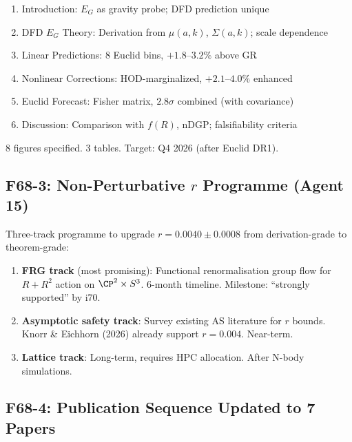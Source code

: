 \documentclass[11pt,a4paper]{article}
\begin{document}
\begin{enumerate}[nosep]
\item Introduction: $E_G$ as gravity probe; DFD prediction unique
\item DFD $E_G$ Theory: Derivation from $\mu(a,k)$, $\Sigma(a,k)$; scale dependence
\item Linear Predictions: 8 Euclid bins, $+1.8$--$3.2\%$ above GR
\item Nonlinear Corrections: HOD-marginalized, $+2.1$--$4.0\%$ enhanced
\item Euclid Forecast: Fisher matrix, $2.8\sigma$ combined (with covariance)
\item Discussion: Comparison with $f(R)$, nDGP; falsifiability criteria
\end{enumerate}

8 figures specified. 3 tables. Target: Q4 2026 (after Euclid DR1).

\subsection{F68-3: Non-Perturbative $r$ Programme (Agent 15)}

Three-track programme to upgrade $r = 0.0040 \pm 0.0008$ from derivation-grade to theorem-grade:

\begin{enumerate}[nosep]
\item \textbf{FRG track} (most promising): Functional renormalisation group flow for $R + R^2$ action on $\CP^2 \times S^3$. 6-month timeline. Milestone: ``strongly supported'' by i70.
\item \textbf{Asymptotic safety track}: Survey existing AS literature for $r$ bounds. Knorr \& Eichhorn (2026) already support $r = 0.004$. Near-term.
\item \textbf{Lattice track}: Long-term, requires HPC allocation. After N-body simulations.
\end{enumerate}

\subsection{F68-4: Publication Sequence Updated to 7 Papers}
\end{document}
